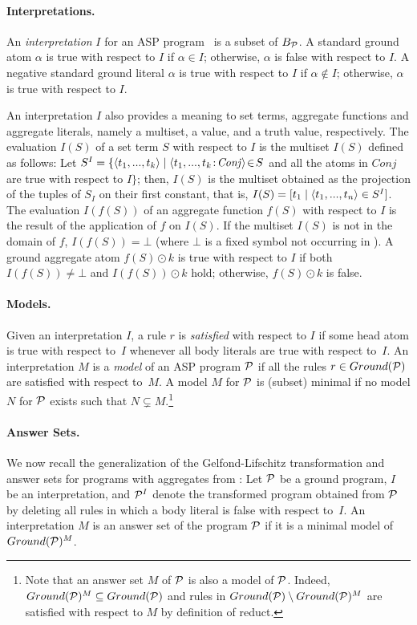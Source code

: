 \documentclass{tlp}
\begin{document}
\paragraph{Interpretations.}
An {\em interpretation} $I$ for an ASP program \p\ is a subset of $B_{{\cal P}}$.
A standard ground atom $\alpha$ is true with respect to $I$ if $\alpha \in I$;
otherwise, $\alpha$ is false with respect to $I$.
A negative standard ground literal  $\alpha$ is true with respect to $I$ if $\alpha \not\in I$;
otherwise,  $\alpha$ is true with respect to $I$.

An interpretation $I$ also provides a meaning to set terms, aggregate functions and aggregate literals, namely a multiset, a value, and a truth value, respectively.
The evaluation $I(S)$ of a set term $S$ with respect to $I$ is the multiset $I(S)$ defined as follows:
Let $S^I=\{\langle t_1,...,t_k\rangle\mid \langle t_1,...,t_k\!:\!\mathit{Conj}\rangle\!\in\! S$ and all the atoms in $Conj$ are true with respect to $I\}$;
then, $I(S)$ is the multiset obtained as the projection of the tuples of $S_I$ on their first constant, that is, $I(S)=[t_1 \mid \langle t_1,...,t_n\rangle \in S^I ]$.
The evaluation $I(f(S))$ of an aggregate function $f(S)$ with respect to $I$ is the result of the application of $f$ on $I(S)$.
If the multiset $I(S)$ is not in the domain of $f$, $I(f(S))= \bot$ (where $\bot$ is a fixed symbol not occurring in \p).
A ground aggregate atom $f(S) \odot k$ is true with respect to $I$ if both
$I(f(S))\neq \bot$ and
$I(f(S)) \odot k$ hold;
otherwise, $f(S) \odot k$ is false.


\paragraph{Models.}
Given an interpretation $I$, a rule $r$ is {\em satisfied} with respect to $I$ if some head atom is true with respect to\ $I$ whenever all body literals are true with respect to\ $I$.
An interpretation $M$ is a {\em model} of an ASP program ${\cal P}$ if all the rules $r \in Ground({\cal P})$ are satisfied with respect to\ $M$.
A model $M$ for ${\cal P}$ is (subset) minimal if no model $N$ for ${\cal P}$ exists such that $N \subsetneq M$.\footnote{Note that an answer set $M$ of ${\cal P}$ is also a model of ${\cal P}$.
Indeed, $Ground({\cal P})^M \subseteq Ground({\cal P})$ and rules in $Ground({\cal P}) \setminus Ground({\cal P})^M$ are satisfied with respect to $M$ by definition of reduct.
}

\paragraph{Answer Sets.}
We now recall the generalization of the Gelfond-Lifschitz transformation and answer sets for programs with aggregates from :
Let ${\cal P}$ be a ground program, $I$ be an interpretation, and ${\cal P}^I$ denote the transformed program obtained from ${\cal P}$ by deleting all rules in which a body literal is false with respect to\ $I$.
An interpretation $M$ is an answer set of the program ${\cal P}$ if it is a minimal model of $Ground({\cal P})^M$.
\end{document}
